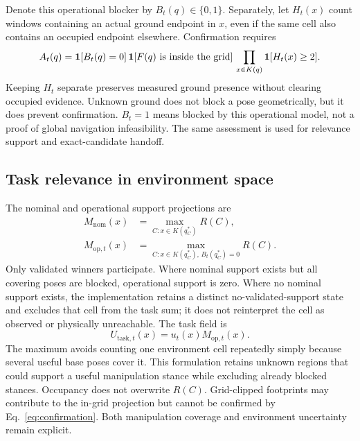 Denote this operational blocker by $B_t(q)\in\{0,1\}$. Separately, let $H_t(x)$
count windows containing an actual ground endpoint in $x$, even if the same cell
also contains an occupied endpoint elsewhere. Confirmation requires
\begin{equation}
 A_t(q)=\mathbf{1}[B_t(q)=0]\,
 \mathbf{1}[F(q)\text{ is inside the grid}]\,
 \prod_{x\in K(q)}\mathbf{1}[H_t(x)\ge 2].
 \label{eq:confirmation}
\end{equation}
Keeping $H_t$ separate preserves measured ground presence without clearing
occupied evidence. Unknown ground does not block a pose geometrically, but it
does prevent confirmation. $B_t=1$ means blocked by this operational model,
not a proof of global navigation infeasibility. The same assessment is used
for relevance support and exact-candidate handoff.

\subsection{Task relevance in environment space}
\label{sec:projection}
The nominal and operational support projections are
\begin{align}
 M_{\mathrm{nom}}(x)&=\max_{C:x\in K(q_C^*)} R(C),\label{eq:nominal}\\
 M_{\mathrm{op},t}(x)&=\max_{C:x\in K(q_C^*),\,B_t(q_C^*)=0}R(C).
 \label{eq:operational}
\end{align}
Only validated winners participate. Where nominal support exists but all
covering poses are blocked, operational support is zero. Where no nominal
support exists, the implementation retains a distinct no-validated-support
state and excludes that cell from the task sum; it does not reinterpret the
cell as observed or physically unreachable. The task field is
\begin{equation}
 U_{\mathrm{task},t}(x)=u_t(x)M_{\mathrm{op},t}(x).
 \label{eq:task}
\end{equation}
The maximum avoids counting one environment cell repeatedly simply because
several useful base poses cover it. This formulation retains unknown regions
that could support a useful manipulation stance while excluding already blocked
stances. Occupancy does not overwrite $R(C)$. Grid-clipped footprints may
contribute to the in-grid projection but cannot be confirmed by
Eq.~\eqref{eq:confirmation}. Both manipulation coverage and environment
uncertainty remain explicit.

